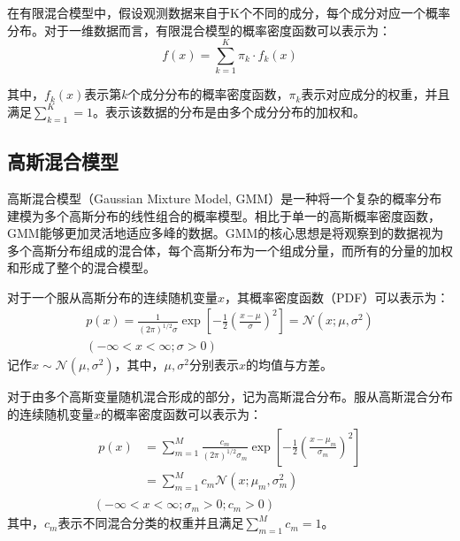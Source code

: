 在有限混合模型中，假设观测数据来自于K个不同的成分，每个成分对应一个概率分布。对于一维数据而言，有限混合模型的概率密度函数可以表示为：
\begin{equation}
    f(x)=\sum_{k=1}^{K}\pi_k \cdot f_k(x)
\end{equation}

其中，$f_k(x)$表示第$k$个成分分布的概率密度函数，$\pi_k$表示对应成分的权重，并且满足$\sum_{k=1}^{K}=1$。表示该数据的分布是由多个成分分布的加权和。

\subsection{高斯混合模型}
高斯混合模型（Gaussian Mixture Model, GMM）是一种将一个复杂的概率分布建模为多个高斯分布的线性组合的概率模型。相比于单一的高斯概率密度函数，GMM能够更加灵活地适应多峰的数据。GMM的核心思想是将观察到的数据视为多个高斯分布组成的混合体，每个高斯分布为一个组成分量，而所有的分量的加权和形成了整个的混合模型。

对于一个服从高斯分布的连续随机变量$x$，其概率密度函数（PDF）可以表示为：
\begin{equation}
    \begin{gathered}
        p\left( x \right) =\frac{1}{\left( 2\pi \right) ^{1/2}\sigma}\exp \left[ -\frac{1}{2}\left( \frac{x-\mu}{\sigma} \right) ^2 \right] =\mathcal{N} \left( x;\mu ,\sigma ^2 \right)
        \\
        \left( -\infty <x<\infty ;\sigma >0 \right)
    \end{gathered}
\end{equation}
记作$x \sim \mathcal{N}(\mu,\sigma^2)$，其中，$\mu,\sigma^2$分别表示$x$的均值与方差。

对于由多个高斯变量随机混合形成的部分，记为高斯混合分布。服从高斯混合分布的连续随机变量$x$的概率密度函数可以表示为：
\begin{equation}
    \begin{gathered}
        \begin{aligned}
            p(x) & =\sum_{m=1}^M \frac{c_m}{(2 \pi)^{1 / 2} \sigma_m} \exp \left[-\frac{1}{2}\left(\frac{x-\mu_m}{\sigma_m}\right)^2\right] \\ & =\sum_{m=1}^M c_m \mathcal{N}\left(x ; \mu_m, \sigma_m^2\right)
        \end{aligned}
        \\
        \left(-\infty<x<\infty ; \sigma_m>0 ; c_m>0\right)
    \end{gathered}
\end{equation}
其中，$c_m$表示不同混合分类的权重并且满足$\sum_{m=1}^M c_m=1$。


